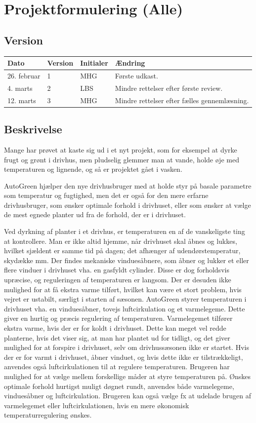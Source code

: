\chapter{Projektformulering (Alle)}
\section{Version}
\begin{table}[h]
	\centering
	\begin{tabularx}{\textwidth - 2cm}{|l|l| l|X|}
	\hline
	Dato	& Version	& Initialer & Ændring	\\ \hline
	26. februar & 1 & MHG & Første udkast. \\ \hline
	4. marts & 2 & LBS & Mindre rettelser efter første review. \\ \hline
	12. marts & 3 & MHG & Mindre rettelser efter fælles gennemlæsning. \\\hline
	\end{tabularx}
\end{table}
\section{Beskrivelse}
Mange har prøvet at kaste sig ud i et nyt projekt, som for eksempel at dyrke frugt og grønt i drivhus, men pludselig glemmer man at vande, holde øje med temperaturen og lignende, og så er projektet gået i vasken.
 
AutoGreen hjælper den nye drivhusbruger med at holde styr på basale parametre som temperatur og fugtighed, men det er også for den mere erfarne drivhusbruger, som ønsker optimale forhold i drivhuset, eller som ønsker at vælge de mest egnede planter ud fra de forhold, der er i drivhuset.
 
Ved dyrkning af planter i et drivhus, er temperaturen en af de vanskeligste ting at kontrollere. Man er ikke altid hjemme, når drivhuset skal åbnes og lukkes, hvilket sjældent er samme tid på dagen; det afhænger af udendørstemperatur, skydække mm. 
Der findes mekaniske vinduesåbnere, som åbner og lukker et eller flere vinduer i drivhuset vha. en gasfyldt cylinder. 
Disse er dog forholdsvis upræcise, og reguleringen af temperaturen er langsom. Der er desuden ikke mulighed for at få ekstra varme tilført, hvilket kan være et stort problem, hvis vejret er ustabilt, særligt i starten af sæsonen. 
AutoGreen styrer temperaturen i drivhuset vha. en vinduesåbner, tovejs luftcirkulation og et varmelegeme. 
Dette giver en hurtig og præcis regulering af temperaturen. Varmelegemet tilfører ekstra varme, hvis der er for koldt i drivhuset. 
Dette kan meget vel redde planterne, hvis det viser sig, at man har plantet ud for tidligt, og det giver mulighed for at forspire i drivhuset, selv om drivhussæsonen ikke er startet. 
Hvis der er for varmt i drivhuset, åbner vinduet, og hvis dette ikke er tilstrækkeligt, anvendes også luftcirkulationen til at regulere temperaturen. 
Brugeren har mulighed for at vælge mellem forskellige måder at styre temperaturen på. Ønskes optimale forhold hurtigst muligt døgnet rundt, anvendes både varmelegeme, vinduesåbner og luftcirkulation. 
Brugeren kan også vælge fx at udelade brugen af varmelegemet eller luftcirkulationen, hvis en mere økonomisk temperaturregulering ønskes. 
 
